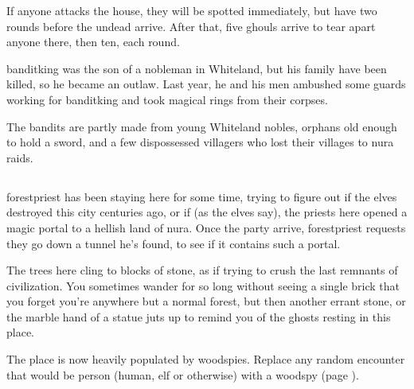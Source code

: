 \begin{multicols}{2}
If anyone attacks the house, they will be spotted immediately, but have two rounds before the undead arrive.
After that, five ghouls arrive to tear apart anyone there, then ten, each round.



\Gls{banditking} was the son of a nobleman in Whiteland, but his family have been killed, so he became an outlaw.
Last year, he and his men ambushed some guards working for \gls{banditking} and took magical rings from their corpses.



The bandits are partly made from young Whiteland nobles, orphans old enough to hold a sword, and a few dispossessed villagers who lost their villages to nura raids.

\humansoldier

\subsection{}\label{lostcity}\setcounter{list}{0}

\Gls{forestpriest} has been staying here for some time, trying to figure out if the elves destroyed this city centuries ago, or if (as the elves say), the priests here opened a magic portal to a hellish land of nura.
Once the party arrive, \gls{forestpriest} requests they go down a tunnel he's found, to see if it contains such a portal.

\begin{boxtext}

The trees here cling to blocks of stone, as if trying to crush the last remnants of civilization.  You sometimes wander for so long without seeing a single brick that you forget you're anywhere but a normal forest, but then another errant stone, or the marble hand of a statue juts up to remind you of the ghosts resting in this place.

\end{boxtext}

The place is now heavily populated by woodspies.  Replace any random encounter that would be person (human, elf or otherwise) with a woodspy (page \pageref{woodspy}).

\end{multicols}

